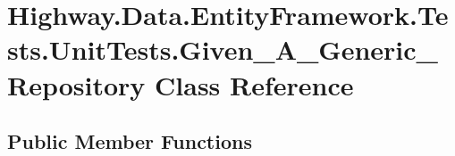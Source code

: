 \hypertarget{class_highway_1_1_data_1_1_entity_framework_1_1_tests_1_1_unit_tests_1_1_given___a___generic___repository}{\section{Highway.\-Data.\-Entity\-Framework.\-Tests.\-Unit\-Tests.\-Given\-\_\-\-A\-\_\-\-Generic\-\_\-\-Repository Class Reference}
\label{class_highway_1_1_data_1_1_entity_framework_1_1_tests_1_1_unit_tests_1_1_given___a___generic___repository}
}
\subsection*{Public Member Functions}
